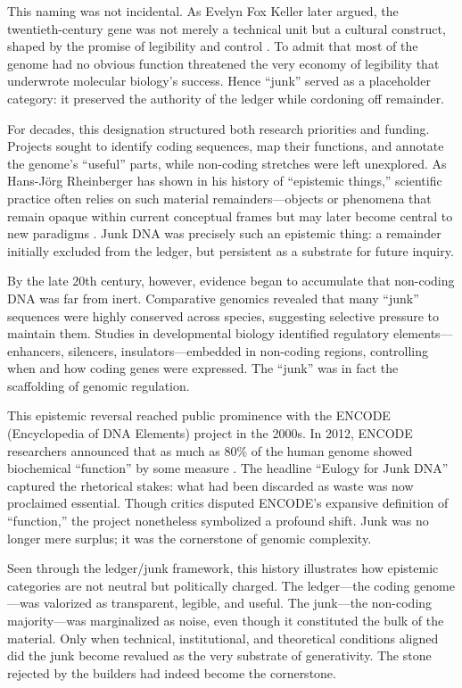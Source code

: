 \documentclass[11pt]{article}
\begin{document}
This naming was not incidental. As Evelyn Fox Keller later argued, the twentieth-century gene was not merely a technical unit but a cultural construct, shaped by the promise of legibility and control \citep{keller2000}. To admit that most of the genome had no obvious function threatened the very economy of legibility that underwrote molecular biology’s success. Hence ``junk'' served as a placeholder category: it preserved the authority of the ledger while cordoning off remainder.

For decades, this designation structured both research priorities and funding. Projects sought to identify coding sequences, map their functions, and annotate the genome’s ``useful'' parts, while non-coding stretches were left unexplored. As Hans-Jörg Rheinberger has shown in his history of ``epistemic things,'' scientific practice often relies on such material remainders---objects or phenomena that remain opaque within current conceptual frames but may later become central to new paradigms \citep{rheinberger1997}. Junk DNA was precisely such an epistemic thing: a remainder initially excluded from the ledger, but persistent as a substrate for future inquiry.

By the late 20th century, however, evidence began to accumulate that non-coding DNA was far from inert. Comparative genomics revealed that many ``junk'' sequences were highly conserved across species, suggesting selective pressure to maintain them. Studies in developmental biology identified regulatory elements---enhancers, silencers, insulators---embedded in non-coding regions, controlling when and how coding genes were expressed. The ``junk'' was in fact the scaffolding of genomic regulation.

This epistemic reversal reached public prominence with the ENCODE (Encyclopedia of DNA Elements) project in the 2000s. In 2012, ENCODE researchers announced that as much as 80\% of the human genome showed biochemical ``function'' by some measure \citep{encode2012, pennisi2012}. The headline ``Eulogy for Junk DNA'' captured the rhetorical stakes: what had been discarded as waste was now proclaimed essential. Though critics disputed ENCODE’s expansive definition of ``function,'' the project nonetheless symbolized a profound shift. Junk was no longer mere surplus; it was the cornerstone of genomic complexity.

Seen through the ledger/junk framework, this history illustrates how epistemic categories are not neutral but politically charged. The ledger---the coding genome---was valorized as transparent, legible, and useful. The junk---the non-coding majority---was marginalized as noise, even though it constituted the bulk of the material. Only when technical, institutional, and theoretical conditions aligned did the junk become revalued as the very substrate of generativity. The stone rejected by the builders had indeed become the cornerstone.
\end{document}
